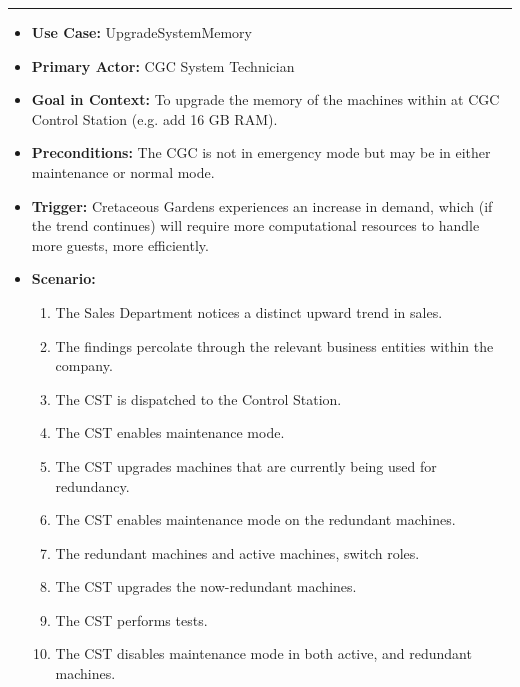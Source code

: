 \documentclass[12pt]{article}
\begin{document}
    \par\noindent\rule{\textwidth}{0.4pt}  
    \begin{itemize}
        \item[]\textbf{Use Case:}                                
            UpgradeSystemMemory

        \item[]\textbf{Primary Actor:}
            CGC System Technician

        \item[]\textbf{Goal in Context:}
            To upgrade the memory of the machines within at CGC Control Station (e.g. add 16 GB RAM).

        \item[]\textbf{Preconditions:}
            The CGC is not in emergency mode but may be in either maintenance or normal mode.

        \item[]\textbf{Trigger:}
            Cretaceous Gardens experiences an increase in demand, which (if the trend continues) will
            require more computational resources to handle more guests, more efficiently.

        \item[]\textbf{Scenario:}
            \begin{enumerate}
                \item The Sales Department notices a distinct upward trend in sales.
                \item The findings percolate through the relevant business entities within the company.
                \item The CST is dispatched to the Control Station.
                \item The CST enables maintenance mode.
                \item The CST upgrades machines that are currently being used for redundancy.
                \item The CST enables maintenance mode on the redundant machines.
                \item The redundant machines and active machines, switch roles.
                \item The CST upgrades the now-redundant machines.
                \item The CST performs tests.
                \item The CST disables maintenance mode in both active, and redundant machines.
            \end{enumerate}


\end{itemize}
\end{document}
